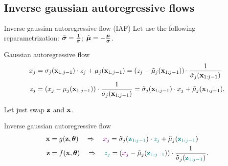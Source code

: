 \subsection{Inverse gaussian autoregressive flows}
\begin{frame}{Inverse gaussian autoregressive flow (IAF)}
	Let use the following reparametrization:
	$\tilde{\boldsymbol{\sigma}} = \frac{1}{\boldsymbol{\sigma}}$; $ \tilde{\boldsymbol{\mu}} = - \frac{\boldsymbol{\mu}}{\boldsymbol{\sigma}}$.
	
	\begin{block}{Gaussian autoregressive flow}
		\vspace{-0.5cm}
		\begin{align*}
			x_j &= \sigma_j (\mathbf{x}_{1:j-1}) \cdot z_j + \mu_j(\mathbf{x}_{1:j-1}) =  \left( z_j - \tilde{\mu}_j(\mathbf{x}_{1:j-1})\right) \cdot \frac{1}{\tilde{\sigma}_j (\mathbf{x}_{1:j-1}) }\\
			z_j &= \left(x_j - \mu_j(\mathbf{x}_{1:j-1}) \right) \cdot \frac{1}{ \sigma_j (\mathbf{x}_{1:j-1})} = \tilde{\sigma}_j (\mathbf{x}_{1:j-1}) \cdot x_j + \tilde{\mu}_j(\mathbf{x}_{1:j-1}).
		\end{align*}
		\vspace{-0.3cm}
	\end{block}
	Let just swap $\mathbf{z}$ and $\mathbf{x}$. 
	
	\begin{block}{Inverse gaussian autoregressive flow}
		\vspace{-0.5cm}
		\begin{align*}
			\mathbf{x} &= g(\mathbf{z}, \boldsymbol{\theta}) \quad \Rightarrow \quad {\color{violet}x_j} = \tilde{\sigma}_j ({\color{teal}\mathbf{z}_{1:j-1}}) \cdot {\color{teal} z_j} + \tilde{\mu}_j({\color{teal}\mathbf{z}_{1:j-1}}) \\
			\mathbf{z} &= f(\mathbf{x}, \boldsymbol{\theta}) \quad \Rightarrow \quad {\color{teal}z_j} = \left( {\color{violet} x_j} - \tilde{\mu}_j({\color{teal}\mathbf{z}_{1:j-1}})\right) \cdot \frac{1}{\tilde{\sigma}_j ({\color{teal}\mathbf{z}_{1:j-1}}) }.
		\end{align*}
		\vspace{-0.3cm}
	\end{block}
	
\end{frame}
